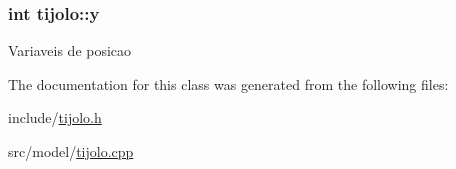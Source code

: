 \subsubsection[{\texorpdfstring{y}{y}}]{\setlength{\rightskip}{0pt plus 5cm}int tijolo\+::y\hspace{0.3cm}{\ttfamily [private]}}\hypertarget{classtijolo_a3089987dab8db697303f88bd59c0989f}{}\label{classtijolo_a3089987dab8db697303f88bd59c0989f}
Variaveis de posicao 

The documentation for this class was generated from the following files\+:\begin{DoxyCompactItemize}
\item 
include/\hyperlink{tijolo_8h}{tijolo.\+h}\item 
src/model/\hyperlink{tijolo_8cpp}{tijolo.\+cpp}\end{DoxyCompactItemize}
